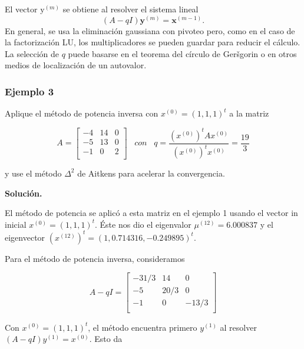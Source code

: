 \documentclass[12pt, a4paper]{article}
\numberwithin{subsection}{section} %
\begin{document}
        El vector $\text{y}^{\left( m \right)}$ se obtiene al resolver el sistema lineal
        \begin{equation*}
        \left( A - qI \right) \textbf{y}^{\left( m \right)} = \textbf{x}^{\left( m - 1 \right)}.
        \end{equation*}
        En general, se usa la eliminación gaussiana con pivoteo pero, como en el caso de la factorización LU, los multiplicadores se pueden guardar para reducir el cálculo. La selección de $q$ puede basarse en el teorema del círculo de Geršgorin o en otros medios de localización de un autovalor.
        
        \subsubsection*{Ejemplo 3} %
        
            Aplique el método de potencia inversa con $x^{(0)} = (1, 1, 1)^t$ a la matriz
        
            $$A =\begin{bmatrix}
                -4 & 14 & 0 \\
                -5 & 13 & 0 \\
                -1 & 0 & 2 \\
            \end{bmatrix} \;\;\; con \;\;\; q = \frac{(x^{(0)})^t Ax^{(0)}}{(x^{(0)})^tx^{(0)}} = \frac{19}{3}$$
        
            y use el método $\Delta^2$ de Aitkens para acelerar la convergencia.
        
            {\bf Solución.}
        
            El método de potencia se aplicó a esta matriz en el ejemplo 1 usando el vector in inicial $x^{(0)} = (1,1,1)^t.$ Éste nos dio el eigenvalor $\mu^{(12)} = 6.000837$ y el eigenvector $(x^{(12)})^t = (1, 0.714316, -0.249895)^t$.
        
            Para el método de potencia inversa, consideramos
        
            $$A - qI =\begin{bmatrix}
                -31/3 & 14 & 0 \\
                -5 & 20/3 & 0 \\
                -1 & 0 & -13/3 \\
            \end{bmatrix}$$
        
            Con $x^(0) = (1, 1, 1)^t$, el método encuentra primero $y^{(1)}$ al resolver $(A- qI)y^{(1)} = x^(0)$. Esto da
        
\end{document}
